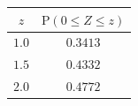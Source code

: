 {\setlength{\tabcolsep}{4pt}\renewcommand{\arraystretch}{1.3}\small%
\begin{tabular}{|c|c|}
\hline
$z$ & $\mathrm{P}(0\le Z\le z)$ \\
\hline
$1.0$ & $0.3413$ \\
\hline
$1.5$ & $0.4332$ \\
\hline
$2.0$ & $0.4772$ \\
\hline
\end{tabular}}

